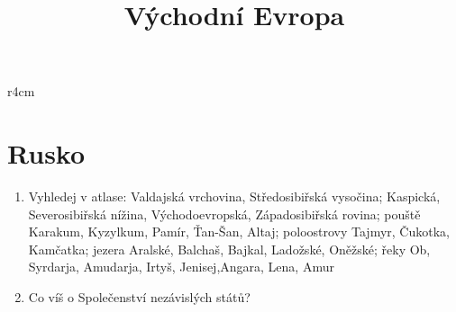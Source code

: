 \title{Východní Evropa}


\newpage
\mbox{}
\vspace{-1.5cm}
\begin{wrapfigure}{r}{4cm}
\vspace{-20pt}
\end{wrapfigure}	
\section{Rusko}
\begin{enumerate}
\item Vyhledej v atlase: Valdajská vrchovina, Středosibiřská vysočina; Kaspická, Severosibiřská nížina, Východoevropská, Západosibiřská rovina; pouště Karakum, Kyzylkum, Pamír, Ťan-Šan, Altaj; poloostrovy Tajmyr, Čukotka, Kamčatka; jezera Aralské, Balchaš, Bajkal, Ladožské, Oněžské; řeky Ob, Syrdarja, Amudarja, Irtyš, Jenisej,Angara, Lena, Amur
\item Co víš o Společenství nezávislých států?
\end{enumerate}


